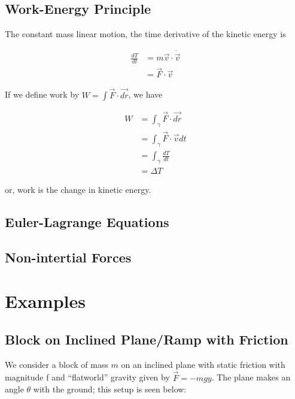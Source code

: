 \documentclass[main.tex]{subfiles}
\begin{document}
\begin{appendices}
\section{Work-Energy Principle} \label{dvn: work-energy}

The constant mass linear motion, the time derivative of the kinetic energy is

\begin{align*}
\frac{dT}{dt} &= m \vec{v} \cdot \dot{\vec{v}} \\
&= \vec{F} \cdot \vec{v}
\end{align*}

If we define work by $W = \int \vec{F} \cdot \vec{dr}$, we have

\begin{align*}
W &= \int_{\gamma} \vec{F} \cdot \vec{dr} \\
&= \int_{\gamma} \vec{F} \cdot \vec{v} dt \\
&= \int_{\gamma} \frac{dT}{dt} \\
&= \Delta T
\end{align*}

or, work is the change in kinetic energy.

\section{Euler-Lagrange Equations}

\section{Non-intertial Forces}

\chapter{Examples}

\section{Block on Inclined Plane/Ramp with Friction}

We consider a block of mass $m$ on an inclined plane with static friction with magnitude
f and ``flatworld'' gravity  given by $\vec{F}  = -mg\unit{y}$. The plane makes an angle
$\theta$ with the ground; this setup is seen below:

\begin{figure}[h]
\label{fig: block-ramp}
\end{figure}


\end{appendices}
\end{document}
